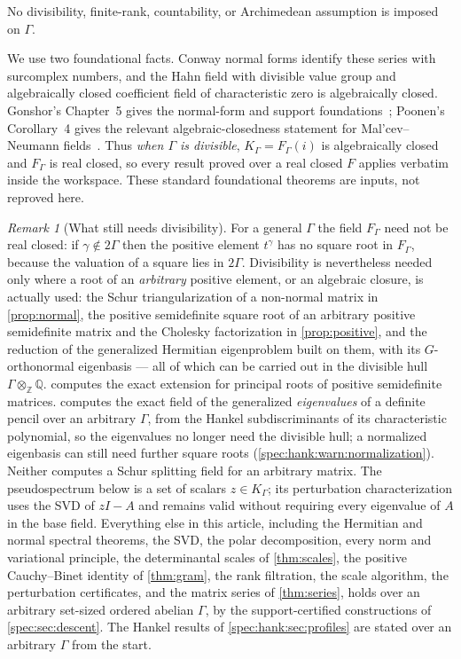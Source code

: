 \documentclass[11pt,a4paper]{article}
\numberwithin{equation}{section}
\theoremstyle{definition}
\theoremstyle{remark}
\newtheorem{remark}[remark]{Remark}
\newcommand{\Q}{\mathbb Q}
\newcommand{\Z}{\mathbb Z}
\begin{document}
No divisibility, finite-rank, countability, or Archimedean assumption is
imposed on $\Gamma$.

We use two foundational facts. Conway normal forms identify these series
with surcomplex numbers, and the Hahn field with divisible value group and
algebraically closed coefficient field of characteristic zero is
algebraically closed. Gonshor's Chapter~5 gives the normal-form and support
foundations~\cite{Gonshor}; Poonen's Corollary~4 gives the relevant
algebraic-closedness statement for Mal'cev--Neumann fields~\cite{Poonen}.
Thus \emph{when $\Gamma$ is divisible}, $K_\Gamma=F_\Gamma(i)$ is
algebraically closed and $F_\Gamma$ is real closed, so every result proved
over a real closed $F$ applies verbatim inside the workspace. These standard
foundational theorems are inputs, not reproved here.

\begin{remark}[What still needs divisibility]\label{spec:rem:divisibility}
For a general $\Gamma$ the field $F_\Gamma$ need not be real closed:
if $\gamma\notin2\Gamma$ then the positive element $t^\gamma$ has no square
root in $F_\Gamma$, because the valuation of a square lies in $2\Gamma$.
Divisibility is nevertheless needed only where a root of an
\emph{arbitrary} positive element, or an algebraic closure, is actually
used: the Schur triangularization of a non-normal matrix in
\cref{prop:normal}, the positive semidefinite square root of an arbitrary
positive semidefinite matrix and the Cholesky factorization in
\cref{prop:positive}, and the reduction of the generalized Hermitian
eigenproblem built on them, with its $G$-orthonormal eigenbasis --- all of
which can be carried out in the divisible hull $\Gamma\otimes_\Z\Q$.
 computes the exact extension for principal roots
of positive semidefinite matrices.  computes the
exact field of the generalized \emph{eigenvalues} of a definite pencil over an
arbitrary $\Gamma$, from the Hankel subdiscriminants of its characteristic
polynomial, so the eigenvalues no longer need the divisible hull; a
normalized eigenbasis can still need further square roots
(\cref{spec:hank:warn:normalization}). Neither computes a Schur splitting
field for an arbitrary matrix. The pseudospectrum below is a set of scalars
$z\in K_\Gamma$; its perturbation characterization uses the SVD of $zI-A$
and remains valid without requiring every eigenvalue of $A$ in the base field.
Everything else in this article, including
the Hermitian and normal spectral theorems, the SVD, the polar
decomposition, every norm and variational principle, the determinantal
scales of \cref{thm:scales}, the positive Cauchy--Binet identity of
\cref{thm:gram}, the rank filtration, the scale algorithm, the perturbation
certificates, and the matrix series of \cref{thm:series}, holds over an
arbitrary set-sized ordered abelian $\Gamma$, by the support-certified
constructions of \cref{spec:sec:descent}. The Hankel results of
\cref{spec:hank:sec:profiles} are stated over an arbitrary $\Gamma$ from the
start.
\end{remark}
\end{document}
